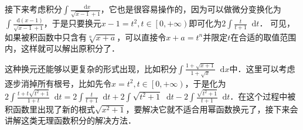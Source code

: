 \documentclass{ctexbook}
\newcommand*{\dif}{\mathop{}\!\mathrm{d}}
\begin{document}
接下来考虑积分$\int\frac{\dif{x}}{\sqrt{x-1}+1}$，它也是很容易操作的，因为可以做微分变换化为$\int\frac{\dif{\left(x-1\right)}}{\sqrt{x-1}+1}$，于是只要换元$x-1=t^{2},t\in\left[0,+\infty\right)$即可化为$2\int\frac{t}{t+1}\dif{t}$．
可见，如果被积函数中只含有$\sqrt[n]{x+a}$，可以直接令$x+a=t^{n}$并限定$t$在合适的取值范围内，这样就可以解出原积分了．\par
这种换元还能够以更复杂的形式出现，比如积分$\int\frac{1+\sqrt{x+1}}{1+\sqrt{x}}\dif{x}$中．这里可以考虑逐步消掉所有根号，比如先令$x=t^{2},t\in\left[0,+\infty\right)$，于是化为$2\int\frac{t+t\sqrt{t^{2}+1}}{1+t}\dif{t}=2\int\frac{t}{t+1}\dif{t}+2\int\sqrt{t^{2}+1}\dif{t}-2\int\frac{\sqrt{t^{2}+1}}{t+1}\dif{t}$．在这个过程中被积函数里出现了新的根式$\sqrt{x^{2}+1}$，要解决它就不适合用幂函数换元了，接下来会讲解这类无理函数积分的解决方法．\par
\end{document}
